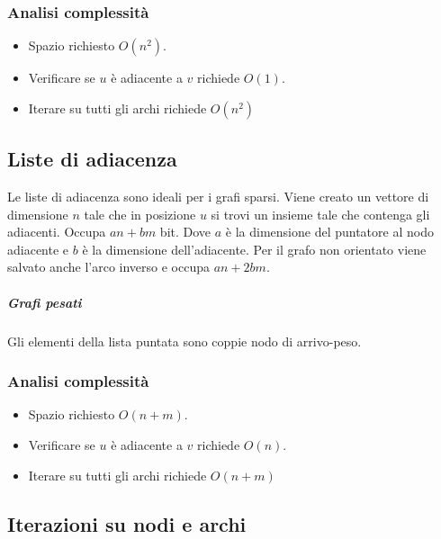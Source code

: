 \subsubsection{Analisi complessit\`a}
\begin{itemize}
\item Spazio richiesto $O(n^2)$.
\item Verificare se $u$ \`e adiacente a $v$ richiede $O(1)$.
\item Iterare su tutti gli archi richiede $O(n^2)$
\end{itemize}
\subsection{Liste di adiacenza}
Le liste di adiacenza sono ideali per i grafi sparsi. Viene creato un vettore di dimensione $n$ tale che in posizione $u$ si trovi un insieme tale che 
contenga gli adiacenti. Occupa $an+bm$ bit. Dove $a$ \`e la dimensione del puntatore al nodo adiacente e $b$ \`e la dimensione dell'adiacente. Per il grafo 
non orientato viene salvato anche l'arco inverso e occupa $an+2bm$.
\subparagraph{Grafi pesati}
Gli elementi della lista puntata sono coppie nodo di arrivo-peso.
\subsubsection{Analisi complessit\`a}
\begin{itemize}
\item Spazio richiesto $O(n+m)$.
\item Verificare se $u$ \`e adiacente a $v$ richiede $O(n)$.
\item Iterare su tutti gli archi richiede $O(n+m)$
\end{itemize}
\subsection{Iterazioni su nodi e archi}
\begin{multicols}{2}
\begin{algorithm}[H]
\caption{Iterazione su tutti i nodi del grafo}
\end{algorithm}
\columnbreak
\begin{algorithm}[H]
\caption{Iterazione su tutti i nodi e archi del grafo}
\end{algorithm}
\end{multicols}
